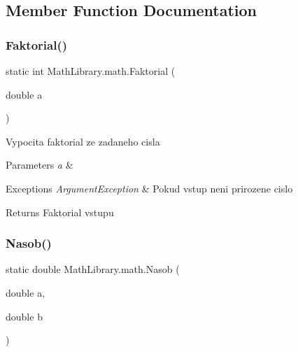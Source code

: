 \subsection{Member Function Documentation}
\mbox{\label{class_math_library_1_1math_af838c111bbe0f378bb2ccfb3591cce3a}} 
\subsubsection{\texorpdfstring{Faktorial()}{Faktorial()}}
{\footnotesize\ttfamily static int Math\+Library.\+math.\+Faktorial (\begin{DoxyParamCaption}\item[{double}]{a }\end{DoxyParamCaption})\hspace{0.3cm}{\ttfamily [static]}}



Vypocita faktorial ze zadaneho cisla 


\begin{DoxyParams}{Parameters}
{\em a} & \\
\hline
\end{DoxyParams}

\begin{DoxyExceptions}{Exceptions}
{\em Argument\+Exception} & Pokud vstup neni prirozene cislo\\
\hline
\end{DoxyExceptions}
\begin{DoxyReturn}{Returns}
Faktorial vstupu
\end{DoxyReturn}
\mbox{\label{class_math_library_1_1math_a39f0ce528d77e03cf63a00333f5973e6}} 
\subsubsection{\texorpdfstring{Nasob()}{Nasob()}}
{\footnotesize\ttfamily static double Math\+Library.\+math.\+Nasob (\begin{DoxyParamCaption}\item[{double}]{a,  }\item[{double}]{b }\end{DoxyParamCaption})\hspace{0.3cm}{\ttfamily [static]}}



